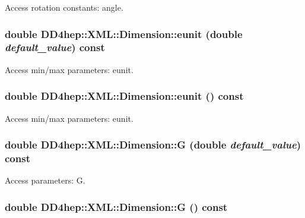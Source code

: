 Access rotation constants: angle. \hypertarget{struct_d_d4hep_1_1_x_m_l_1_1_dimension_a8e66ed268a1122ddad6ba84aed7866ed}{
\subsubsection[{eunit}]{\setlength{\rightskip}{0pt plus 5cm}double DD4hep::XML::Dimension::eunit (double {\em default\_\-value}) const}}
\label{struct_d_d4hep_1_1_x_m_l_1_1_dimension_a8e66ed268a1122ddad6ba84aed7866ed}


Access min/max parameters: eunit. \hypertarget{struct_d_d4hep_1_1_x_m_l_1_1_dimension_a39d0f18922e9d8520aaec40d296ae27d}{
\subsubsection[{eunit}]{\setlength{\rightskip}{0pt plus 5cm}double DD4hep::XML::Dimension::eunit () const}}
\label{struct_d_d4hep_1_1_x_m_l_1_1_dimension_a39d0f18922e9d8520aaec40d296ae27d}


Access min/max parameters: eunit. \hypertarget{struct_d_d4hep_1_1_x_m_l_1_1_dimension_ac3414e227bb3ded9073db905d153f0cf}{
\subsubsection[{G}]{\setlength{\rightskip}{0pt plus 5cm}double DD4hep::XML::Dimension::G (double {\em default\_\-value}) const}}
\label{struct_d_d4hep_1_1_x_m_l_1_1_dimension_ac3414e227bb3ded9073db905d153f0cf}


Access parameters: G. \hypertarget{struct_d_d4hep_1_1_x_m_l_1_1_dimension_a29115a7ce10d04d3b2be7ec5cf707a04}{
\subsubsection[{G}]{\setlength{\rightskip}{0pt plus 5cm}double DD4hep::XML::Dimension::G () const}}
\label{struct_d_d4hep_1_1_x_m_l_1_1_dimension_a29115a7ce10d04d3b2be7ec5cf707a04}


